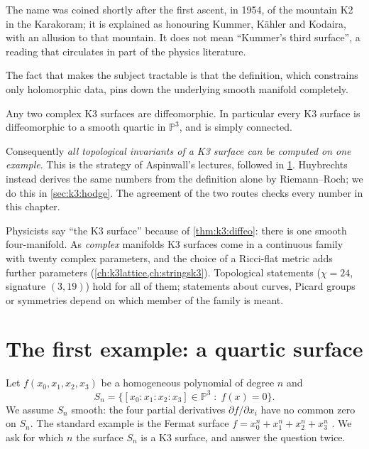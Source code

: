 \begin{historybox}[Why ``K3''?]
The name was coined shortly after the first ascent, in 1954, of the mountain K2 in the
Karakoram; it is explained as honouring Kummer, Kähler and Kodaira, with an allusion to that
mountain. It does not mean ``Kummer's third surface'', a reading that circulates in
part of the physics literature. 
\end{historybox}

The fact that makes the subject tractable is that the definition, which constrains only
holomorphic data, pins down the underlying smooth manifold completely.

\begin{theorem}\label{thm:k3:diffeo}
Any two complex K3 surfaces are diffeomorphic. In particular every K3 surface is diffeomorphic
to a smooth quartic in $\mathbb{P}^3$, and is simply connected. \TL{}
\end{theorem}

Consequently \emph{all topological invariants of a K3 surface can be computed on one example}.
This is the strategy of Aspinwall's lectures, followed in \cref{sec:k3:quartic}. Huybrechts
instead derives the same numbers from the definition alone by Riemann--Roch; we do this in
\cref{sec:k3:hodge}. The agreement of the two routes checks every number in this chapter.

\begin{pitfallbox}
Physicists say ``the K3 surface'' because of \cref{thm:k3:diffeo}: there is one smooth
four-manifold. As \emph{complex} manifolds K3 surfaces come in a continuous family with
twenty complex parameters, and the choice of a Ricci-flat metric adds further parameters
(\cref{ch:k3lattice,ch:stringsk3}). Topological statements ($\chi=24$, signature $(3,19)$) hold for all of them;
statements about curves, Picard groups or symmetries depend on which member of the family is
meant.
\end{pitfallbox}

\section{The first example: a quartic surface}\label{sec:k3:quartic}

Let $f(x_0,x_1,x_2,x_3)$ be a homogeneous polynomial of degree $n$ and
\begin{equation}\label{eq:k3:hypersurface}
  S_n=\{[x_0:x_1:x_2:x_3]\in\mathbb{P}^3 \;:\; f(x)=0\}.
\end{equation}
We assume $S_n$ smooth: the four partial derivatives $\partial f/\partial x_i$ have no common
zero on $S_n$. The standard example is the Fermat surface
$f=x_0^n+x_1^n+x_2^n+x_3^n$ . We ask for which $n$ the
surface $S_n$ is a K3 surface, and answer the question twice.

